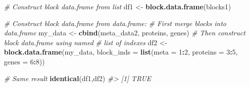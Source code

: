 \documentclass[
]{article}
\newenvironment{Shaded}{\begin{snugshade}}{\end{snugshade}}
\newcommand{\AttributeTok}[1]{\textcolor[rgb]{0.13,0.29,0.53}{#1}}
\newcommand{\CommentTok}[1]{\textcolor[rgb]{0.56,0.35,0.01}{\textit{#1}}}
\newcommand{\DecValTok}[1]{\textcolor[rgb]{0.00,0.00,0.81}{#1}}
\newcommand{\FunctionTok}[1]{\textcolor[rgb]{0.13,0.29,0.53}{\textbf{#1}}}
\newcommand{\NormalTok}[1]{#1}
\newcommand{\OtherTok}[1]{\textcolor[rgb]{0.56,0.35,0.01}{#1}}
\newcommand{\SpecialCharTok}[1]{\textcolor[rgb]{0.81,0.36,0.00}{\textbf{#1}}}
\begin{document}
\begin{Shaded}
\begin{Highlighting}[]
\CommentTok{\# Construct block data.frame from list}
\NormalTok{df1 }\OtherTok{\textless{}{-}} \FunctionTok{block.data.frame}\NormalTok{(blocks1)}

\CommentTok{\# Construct block data.frame from data.frame:}
\CommentTok{\# First merge blocks into data.frame}
\NormalTok{my\_data }\OtherTok{\textless{}{-}} \FunctionTok{cbind}\NormalTok{(meta\_data2, proteins, genes)}
\CommentTok{\# Then construct block data.frame using named }
\CommentTok{\# list of indexes}
\NormalTok{df2 }\OtherTok{\textless{}{-}} \FunctionTok{block.data.frame}\NormalTok{(my\_data, }\AttributeTok{block\_inds =} 
        \FunctionTok{list}\NormalTok{(}\AttributeTok{meta =} \DecValTok{1}\SpecialCharTok{:}\DecValTok{2}\NormalTok{, }\AttributeTok{proteins =} \DecValTok{3}\SpecialCharTok{:}\DecValTok{5}\NormalTok{, }\AttributeTok{genes =} \DecValTok{6}\SpecialCharTok{:}\DecValTok{8}\NormalTok{))}

\CommentTok{\# Same result}
\FunctionTok{identical}\NormalTok{(df1,df2)}
\CommentTok{\#\textgreater{} [1] TRUE}


\end{Highlighting}
\end{Shaded}
\end{document}
